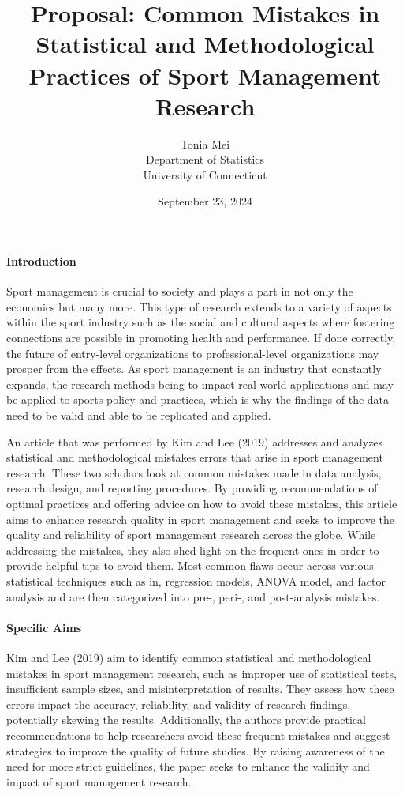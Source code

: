 \documentclass[12pt]{article}
\title{Proposal: Common Mistakes in Statistical and Methodological Practices of Sport Management Research}
\author{Tonia Mei\\
  Department of Statistics\\
  University of Connecticut
}
\date{September 23, 2024}
\begin{document}
\maketitle


\paragraph{Introduction}
Sport management is crucial to society and plays a part in not only the economics but many more. This type of research extends to a variety of aspects within the sport industry such as the social and cultural aspects where fostering connections are possible in promoting health and performance. If done correctly, the future of entry-level organizations to professional-level organizations may prosper from the effects. As sport management is an industry that constantly expands, the research methods being to impact real-world applications and may be applied to sports policy and practices, which is why the findings of the data need to be valid and able to be replicated and applied.

An article that was performed by Kim and Lee (2019) addresses and analyzes statistical and methodological mistakes errors that arise in sport management research. These two scholars look at common mistakes made in data analysis, research design, and reporting procedures. By providing recommendations of optimal practices and offering advice on how to avoid these mistakes, this article aims to enhance research quality in sport management and seeks to improve the quality and reliability of sport management research across the globe. While addressing the mistakes, they also shed light on the frequent ones in order to provide helpful tips to avoid them. Most common flaws occur across various statistical techniques such as in, regression models, ANOVA model, and factor analysis and are then categorized into pre-, peri-, and post-analysis mistakes.


\paragraph{Specific Aims}
Kim and Lee (2019) aim to identify common statistical and methodological mistakes in sport management research, such as improper use of statistical tests, insufficient sample sizes, and misinterpretation of results. They assess how these errors impact the accuracy, reliability, and validity of research findings, potentially skewing the results. Additionally, the authors provide practical recommendations to help researchers avoid these frequent mistakes and suggest strategies to improve the quality of future studies. By raising awareness of the need for more strict guidelines, the paper seeks to enhance the validity and impact of sport management research.
\end{document}
